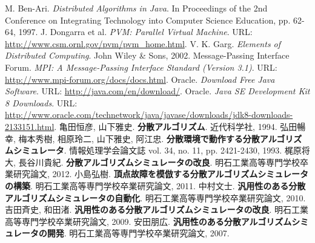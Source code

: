 \begin{thebibliography}{99}
   M. Ben-Ari. {\it Distributed Algorithms in Java}. In Proceedings of the 2nd Conference on Integrating Technology into Computer Science Education, pp. 62-64, 1997.
	 J. Dongarra et al. {\it PVM: Parallel Virtual Machine}. URL: \url{http://www.csm.ornl.gov/pvm/pvm_home.html}.
	 V. K. Garg. {\it Elements of Distributed Computing}. John Wiley \& Sons, 2002.
	 Message-Passing Interface Forum. {\it MPI: A Message-Passing Interface Standard (Version 3.1)}. URL: \url{http://www.mpi-forum.org/docs/docs.html}.
	 Oracle. {\it Download Free Java Software}. URL: \url{http://java.com/en/download/}.
	 Oracle. {\it Java SE Development Kit 8 Downloads}. URL: \url{http://www.oracle.com/technetwork/java/javase/downloads/jdk8-downloads-2133151.html}.
	 亀田恒彦, 山下雅史. {\bf 分散アルゴリズム}. 近代科学社, 1994.
	 弘田暢幸, 梅本秀樹, 相原玲二, 山下雅史, 阿江忠. {\bf 分散環境で動作する分散アルゴリズムシミュレータ}. 情報処理学会論文誌 vol. 34, no. 11, pp. 2421-2430, 1993.
	 梶原将大, 長谷川貴紀. {\bf 分散アルゴリズムシミュレータの改良}. 明石工業高等専門学校卒業研究論文, 2012.
	 小島弘樹. {\bf 頂点故障を模倣する分散アルゴリズムシミュレータの構築}. 明石工業高等専門学校卒業研究論文, 2011.
	 中村文士. {\bf 汎用性のある分散アルゴリズムシミュレータの自動化}. 明石工業高等専門学校卒業研究論文, 2010.
	 吉田斉史, 和田渚. {\bf 汎用性のある分散アルゴリズムシミュレータの改良}. 明石工業高等専門学校卒業研究論文, 2009.
	 安田朋広. {\bf 汎用性のある分散アルゴリズムシミュレータの開発}. 明石工業高等専門学校卒業研究論文, 2007.
\end{thebibliography}
